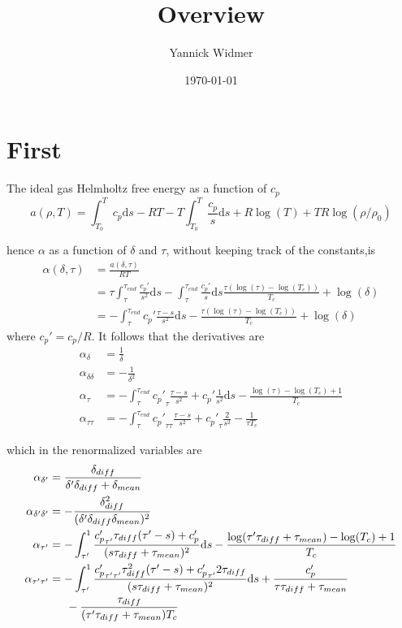 \documentclass[a4paper,10pt]{article}
\title{Overview}
\author{Yannick Widmer}
\date{\today}
\begin{document}
\maketitle
\section{First}
The ideal gas Helmholtz free energy as a function of $c_p$
\[
	a(\rho,T)=\int_{T_0}^T c_p\mathrm{d}s - RT- T\int_{T_0}^T \frac{c_p}{s} \mathrm{d}s + R\log(T)+TR\log(\rho/\rho_0)
\]

hence $\alpha$ as a function of $\delta$  and $\tau$, without keeping track of the constants,is
\begin{align*}
\alpha(\delta,\tau) &= \frac{a(\delta,\tau)}{RT}
\\&=\tau\int_\tau^{\tau_{end}} \frac{c_p'}{s^2}\mathrm{d}s -\int_\tau^{\tau_{end}} \frac{c_p' }{s} \mathrm{d}s
\frac{\tau (\log(\tau)-\log(T_c))}{T_c}+\log(\delta)
\\&=-\int_\tau^{\tau_{end}} c_p'\frac{\tau-s}{ s^2}\mathrm{d}s-\frac{\tau (\log(\tau)-\log(T_c))}{T_c}+\log(\delta)
\end{align*}
where $c_p'=c_p/R$. It follows that the derivatives are
\begin{align}
\alpha_\delta &= \frac{1}{\delta}
\\ \alpha_{\delta\delta} &= -\frac1{\delta^2}
\\ \alpha_\tau &=-\int_\tau^{\tau_{end}} {c_p'}_\tau \frac{\tau-s}{s^2}+c_p' \frac{1}{s^2}\mathrm{d}s
-\frac{\log(\tau)-\log(T_c)+1}{T_c}
\\ \alpha_{\tau\tau} &= -\int_\tau^{\tau_{end}}{c_p'}_{\tau\tau}\frac{\tau-s}{s^2} +
{c_p'}_\tau\frac{2}{s^2} - \frac{1}{\tau T_c}
\end{align}

which in the renormalized variables are
\begin{align}
\alpha_{\delta'} &= \frac{\delta_{diff}}{\delta' \delta_{diff}+\delta_{mean}}
\\ \alpha_{\delta'\delta'} &= -\frac{\delta_{diff}^2}{(\delta'\delta_{diff}\delta_{mean})^2}
\\ \alpha_{\tau'} &=-\int_{\tau'}^{1} \frac{{c_p'}_{\tau'}\tau_{diff}(\tau'-s)+c_p'}{(s\tau_{diff}+\tau_{mean})^2}\mathrm{d}s
-\frac{\log(\tau'\tau_{diff}+\tau_{mean})-\log(T_c)+1}{T_c}
\\ \alpha_{\tau'\tau'} &= -\int_{\tau'}^{1} \frac{{c_p'}_{\tau'\tau'}\tau_{diff}^2(\tau'-s)+{c_p'}_{\tau'}2\tau_{diff}}{(s\tau_{diff}+\tau_{mean})^2}\mathrm{d}s
+\frac{c_p'}{\tau\tau_{diff}+\tau_{mean}}
\\&\indent-\frac{\tau_{diff}}{(\tau'\tau_{diff}+\tau_{mean})T_c}
\end{align}
\end{document}
